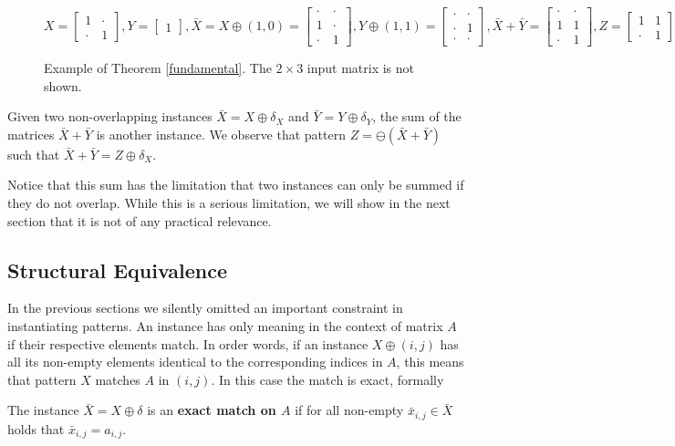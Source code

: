 \documentclass{llncs}
\begin{document}
\begin{figure}

\small
$$
X =
\begin{bmatrix}
1 & \cdot \\[-.2em]
\cdot & 1
\end{bmatrix}\!\!,
Y =
\begin{bmatrix}
1
\end{bmatrix}\!\!,
\bar{X} = X\oplus (1,0) =
\begin{bmatrix}
\cdot & \cdot \\[-.2em]
1 & \cdot \\[-.2em]
\cdot & 1
\end{bmatrix}\!\!,
Y\oplus (1,1) =
\begin{bmatrix}
\cdot & \cdot \\[-.2em]
\cdot & 1 \\[-.2em]
\cdot & \cdot
\end{bmatrix}\!\!,
\bar{X} + \bar{Y} =
\begin{bmatrix}
\cdot & \cdot \\[-.2em]
1 & 1 \\[-.2em]
\cdot & 1
\end{bmatrix}\!\!,
Z =
\begin{bmatrix}
1 & 1 \\[-.2em]
\cdot & 1
\end{bmatrix}\!\!
$$
\caption{Example of Theorem \ref{fundamental}. The $2\times 3$ input matrix is not shown.}
\label{example2}
\end{figure}

\begin{theorem}\label{fundamental}
Given two non-overlapping instances $\bar{X}=X\oplus \delta_X$ and $\bar{Y}=Y\oplus \delta_Y$, the sum of the matrices $\bar{X} + \bar{Y}$ is another instance. We observe that pattern $Z=\ominus(\bar{X} + \bar{Y})$ such that $\bar{X} + \bar{Y} = Z\oplus \delta_X$.
\end{theorem}

Notice that this sum has the limitation that two instances can only be summed if they do not overlap. While this is a serious limitation, we will show in the next section that it is not of any practical relevance.

\subsection{Structural Equivalence}

In the previous sections we silently omitted an important constraint in instantiating patterns. An instance has only meaning in the context of matrix $A$ if their respective elements match. In order words, if an instance $X \oplus (i,j)$ has all its non-empty elements identical to the corresponding indices in $A$, this means that pattern $X$ matches $A$ in $(i,j)$. In this case the match is exact, formally
\begin{definition}
The instance $\bar{X}=X \oplus \delta$ is an \textbf{exact match on $A$} if for all non-empty $\bar{x}_{i,j} \in \bar{X}$ holds that $\bar{x}_{i,j} = a_{i,j}$.
\end{definition}
\end{document}
